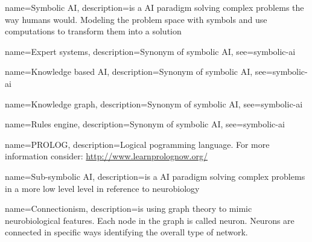 



{
  name={Symbolic AI},
  description={is a AI paradigm solving complex problems the way humans would. Modeling the problem space with symbols and use computations to transform them into a solution}
}

{
  name={Expert systems},
  description={Synonym of symbolic AI},
  see={symbolic-ai}
}

{
  name={Knowledge based AI},
  description={Synonym of symbolic AI},
  see={symbolic-ai}
}

{
  name={Knowledge graph},
  description={Synonym of symbolic AI},
  see={symbolic-ai}
}

{
  name={Rules engine},
  description={Synonym of symbolic AI},
  see={symbolic-ai}
}

{
  name={PROLOG},
  description={Logical pogramming language. For more information consider: \url{http://www.learnprolognow.org/}}
}

{
  name={Sub-symbolic AI},
  description={is a AI paradigm solving complex problems in a more low level level in reference to neurobiology}
}

{
  name={Connectionism},
  description={is using graph theory to mimic neurobiological features. Each node in the graph is called neuron. Neurons are connected in specific ways identifying the overall type of network.}
}